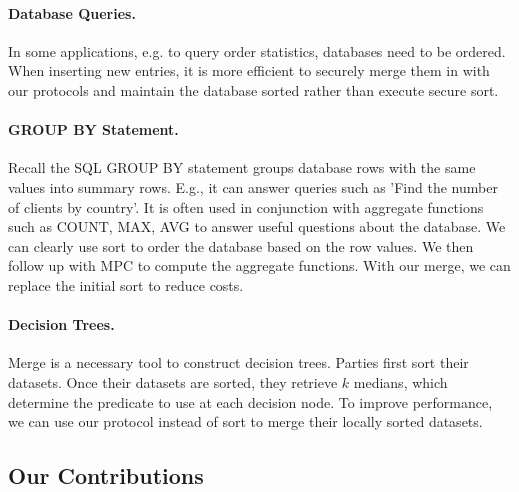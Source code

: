 \paragraph{Database Queries.} In some applications, e.g. to query order statistics, databases need to be ordered. When inserting new entries, it is more efficient to securely merge them in with our protocols and maintain the database sorted rather than execute secure sort. %

\paragraph{GROUP BY Statement.}
Recall the SQL GROUP BY statement groups database rows with the same values into summary rows. E.g., it can answer queries such as 'Find the number of clients by country'. It is often used in conjunction with aggregate functions such as COUNT, MAX, AVG to answer useful questions about the database. We can clearly use sort to order the database based on the row values. We then follow up with MPC to compute the aggregate functions. With our merge, we can replace the initial sort to reduce costs.





\paragraph{Decision Trees.} Merge is a necessary tool to construct decision trees. Parties first sort their datasets. Once their datasets are sorted, they retrieve $k$ medians, which determine the predicate to use at each decision node. To improve performance, we can use our protocol instead of sort to merge their locally sorted datasets. %

\subsection{Our Contributions}\label{sec:contributions}

